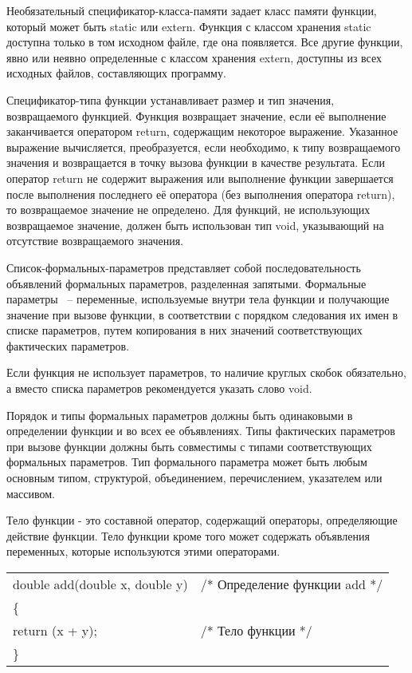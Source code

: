 Необязательный спецификатор-класса-памяти задает класс памяти функции, который может быть static или extern. Функция с классом хранения static доступна только в том исходном файле, где она появляется. Все другие функции, явно или неявно определенные с классом хранения extern, доступны из всех исходных файлов, составляющих программу. \killoverfullbefore

Спецификатор-типа функции устанавливает размер и тип значения, возвращаемого функцией.
Функция возвращает значение, если её выполнение заканчивается оператором return, содержащим некоторое выражение. Указанное выражение вычисляется, преобразуется, если необходимо, к типу возвращаемого значения и возвращается в точку вызова функции в качестве результата. Если оператор return не содержит выражения или выполнение функции завершается после выполнения последнего её оператора (без выполнения оператора return), то возвращаемое значение не определено. Для функций, не использующих возвращаемое значение, должен быть использован тип void, указывающий на отсутствие возвращаемого значения.\killoverfullbefore

Список-формальных-параметров представляет собой последовательность объявлений формальных параметров, разделенная запятыми. Формальные параметры ~-- переменные, используемые внутри тела функции и получающие значение при вызове функции, в соответствии с порядком следования их имен в списке параметров, путем копирования в них значений соответствующих фактических параметров. \killoverfullbefore

Если функция не использует параметров, то наличие круглых скобок обязательно, а вместо списка параметров рекомендуется указать слово void. \killoverfullbefore

Порядок и типы формальных параметров должны быть одинаковыми в определении функции и во всех ее объявлениях. Типы фактических параметров при вызове функции должны быть совместимы с типами соответствующих формальных параметров. Тип формального параметра может быть любым основным типом, структурой, объединением, перечислением, указателем или массивом. \killoverfullbefore

Тело функции - это составной оператор, содержащий операторы, определяющие действие функции. Тело функции кроме того может содержать объявления переменных, которые используются этими операторами.  \killoverfullbefore \BL

\begin{pExample}
\begin{tabular}{ l l }
double add(double x, double y) & \textcolor{exComm}{/* Определение функции add */} \\
\{ & \textcolor{exComm}{} \\
\indent return (x + y); & \textcolor{exComm}{/* Тело функции */} \\
\} & \textcolor{exComm}{} \\
\end{tabular}
\end{pExample}

